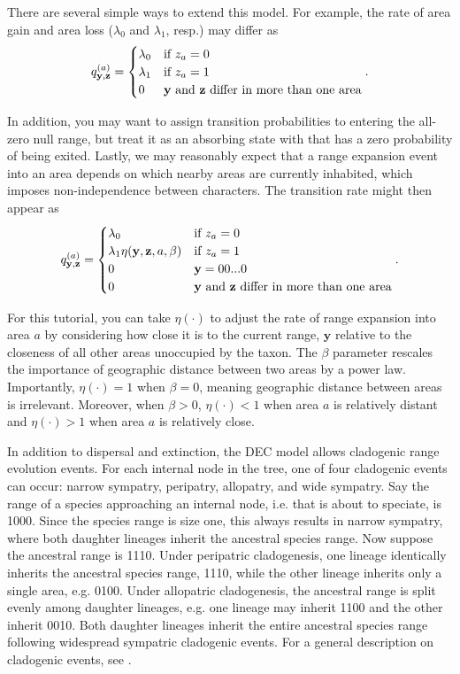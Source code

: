 \documentclass[11pt]{article}
\begin{document}
There are several simple ways to extend this model. For example, the rate of area gain and area loss ($\lambda_0$ and $\lambda_1$, resp.) may differ as
\[
q^{(a)}_{\textbf{y},\textbf{z}} =
\begin{cases}
\lambda_0 & \text{if $z_a=0$}  \\
\lambda_1 & \text{if $z_a=1$} \\
0 & \text{\textbf{y} and \textbf{z} differ in more than one area}
\end{cases}.
\]

In addition, you may want to assign transition probabilities to entering the all-zero null range, but treat it as an absorbing state with that has a zero probability of being exited. 
Lastly, we may reasonably expect that a range expansion event into an area depends on which nearby areas are currently inhabited, which imposes non-independence between characters.
The transition rate might then appear as
\[
q^{(a)}_{\textbf{y},\textbf{z}} =
\begin{cases}
\lambda_0 & \text{if $z_a=0$}  \\
\lambda_1 \eta(\textbf{y}, \textbf{z}, a, \beta) & \text{if $z_a=1$} \\
0 & \mathbf{y} = 00...0 \\
0 & \text{\textbf{y} and \textbf{z} differ in more than one area}
\end{cases}.
\]

For this tutorial, you can take $\eta(\cdot)$ to adjust the rate of range expansion into area $a$ by considering how close it is to the current range, $\textbf{y}$ relative to the closeness of all other areas unoccupied by the taxon.
The $\beta$ parameter rescales the importance of geographic distance between two areas by a power law.
Importantly, $\eta(\cdot) = 1$ when $\beta=0$, meaning geographic distance between areas is irrelevant.
Moreover, when $\beta > 0$, $\eta(\cdot) < 1$ when area $a$ is relatively distant and $\eta(\cdot) > 1$ when area $a$ is relatively close.

In addition to dispersal and extinction, the DEC model allows cladogenic range evolution events.
For each internal node in the tree, one of four cladogenic events can occur: narrow sympatry, peripatry, allopatry, and wide sympatry.
Say the range of a species approaching an internal node, i.e. that is about to speciate, is 1000.
Since the species range is size one, this always results in narrow sympatry, where both daughter lineages inherit the ancestral species range.
Now suppose the ancestral range is 1110.
Under peripatric cladogenesis, one lineage identically inherits the ancestral species range, 1110, while the other lineage inherits only a single area, e.g. 0100.
Under allopatric cladogenesis, the ancestral range is split evenly among daughter lineages, e.g. one lineage may inherit 1100 and the other inherit 0010.
Both daughter lineages inherit the entire ancestral species range following widespread sympatric cladogenic events.
For a general description on cladogenic events, see \citet{matzke13}.
\end{document}
